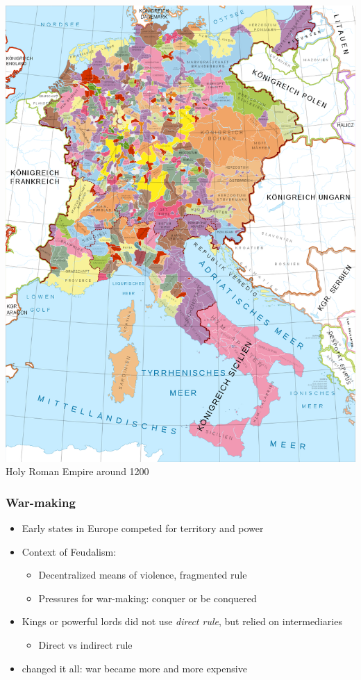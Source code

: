 \documentclass[aspectratio=43, handout]{beamer}
\begin{document}
\begin{frame}
\begin{minipage}{0.49\textwidth}
  \includegraphics[width = \textwidth]{img/holy_roman_empire_1200}\\
  {\small Holy Roman Empire around 1200}
\end{minipage}

\end{frame}

\begin{frame}
\frametitle{War-making}
\centering

\begin{itemize}
\item Early states in Europe competed for territory and power
\item Context of Feudalism:
  \begin{itemize}
    \item Decentralized means of violence, fragmented rule
    \item Pressures for war-making: conquer or be conquered
  \end{itemize}
\item Kings or powerful lords did not use \textit{direct rule}, but relied on intermediaries
\begin{itemize}
  \item Direct vs indirect rule
\end{itemize}
\item<2->  changed it all: war became more and more expensive
\end{itemize}

\end{frame}
\end{document}

